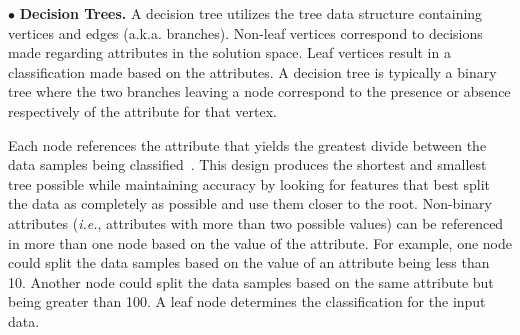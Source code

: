 \documentclass[conference]{IEEEtran}
\begin{document}
$\bullet$ {\bf Decision Trees.} A decision tree utilizes the tree data structure containing vertices and edges (a.k.a. branches). Non-leaf vertices correspond to decisions made regarding attributes in the solution space. Leaf vertices result in a classification made based on the attributes. A decision tree is typically a binary tree where the two branches leaving a node correspond to the presence or absence respectively of the attribute for that vertex.

Each node references the attribute that yields the greatest divide between the data samples being classified~\cite{Russell:10}. This design produces the shortest and smallest tree
possible while maintaining accuracy by looking for features that
best split the data as completely as possible and use them closer to the root.
Non-binary attributes (\emph{i.e.}, attributes with more than two possible values) can be referenced in more than one node based on the value of the attribute. For example, one node could split the data samples based on the value of an attribute being less than 10. Another node could split the data samples based on the same attribute but being greater than 100. A leaf node determines the classification for the input data.


\end{document}
